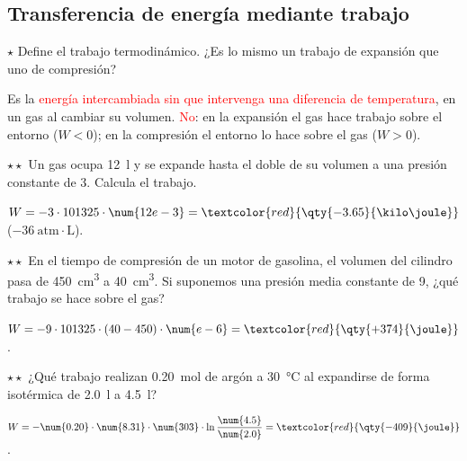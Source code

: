 \subsection{Transferencia de energía mediante trabajo}

\begin{exercise}
    \(\star\) Define el trabajo termodinámico. ¿Es lo mismo un trabajo de expansión que uno de compresión?
    \begin{solu}
        Es la \textcolor{red}{energía intercambiada sin que intervenga una diferencia de temperatura}, en un gas al cambiar su
        volumen. \textcolor{red}{No}: en la expansión el gas hace trabajo sobre el entorno (\(W < 0\)); en la compresión el entorno lo
        hace sobre el gas (\(W > 0\)).
    \end{solu}
\end{exercise}

\begin{exercise}
    \(\star\star\) Un gas ocupa \qty{12}{\litre} y se expande hasta el doble de su volumen a una presión constante de \qty{3}{\atm}.
    Calcula el trabajo.
    \begin{solu}
        \(W = -3 \cdot 101325 \cdot \num{12e-3} = \textcolor{red}{\qty{-3.65}{\kilo\joule}}\) (\(\num{-36}~\mathrm{atm\cdot L}\)).
    \end{solu}
\end{exercise}

\begin{exercise}
    \(\star\star\) En el tiempo de compresión de un motor de gasolina, el volumen del cilindro pasa de \qty{450}{\cm\cubed} a
    \qty{40}{\cm\cubed}. Si suponemos una presión media constante de \qty{9}{\atm}, ¿qué trabajo se hace sobre el gas?
    \begin{solu}
        \(W = -9 \cdot 101325 \cdot (40 - 450) \cdot \num{e-6} = \textcolor{red}{\qty{+374}{\joule}}\).
    \end{solu}
\end{exercise}

\begin{exercise}
    \(\star\star\) ¿Qué trabajo realizan \qty{0.20}{\mol} de argón a \qty{30}{\degreeCelsius} al expandirse de forma isotérmica de
    \qty{2.0}{\litre} a \qty{4.5}{\litre}?
    \begin{solu}
        \(W = -\num{0.20} \cdot \num{8.31} \cdot \num{303} \cdot \ln\dfrac{\num{4.5}}{\num{2.0}} = \textcolor{red}{\qty{-409}{\joule}}\).
    \end{solu}
\end{exercise}

